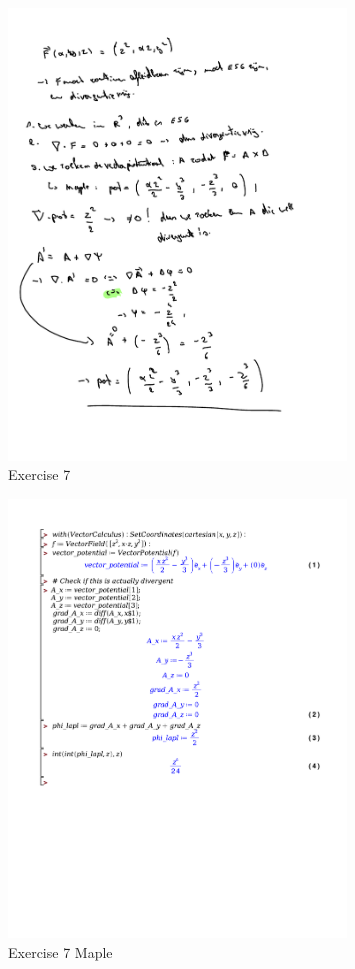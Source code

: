 \documentclass[a4paper]{report}
\begin{document}
\begin{figure}[H]
	\centering
	\includegraphics[width=0.8\textwidth]{assets/huis_6_ex_7.pdf}
	\caption{Exercise 7}
	\label{fig:huis_6_ex_7}
\end{figure}

\begin{figure}[H]
	\centering
	\includegraphics[width=0.8\textwidth]{exercises/huis_6_ex_7.pdf}
	\caption{Exercise 7 Maple}
\end{figure}
\end{document}
